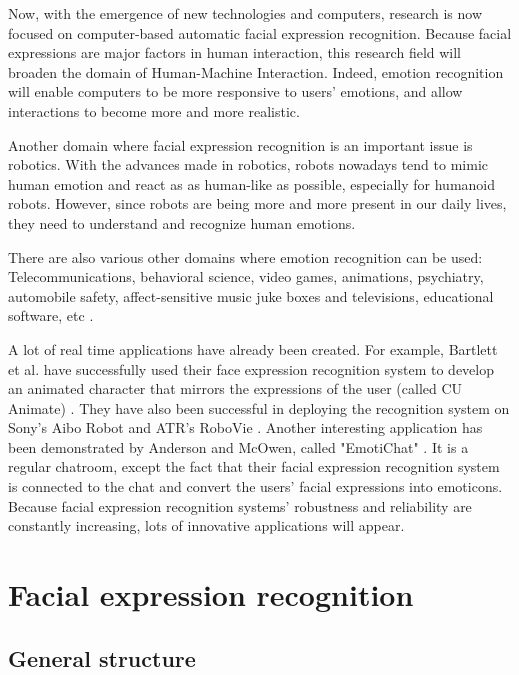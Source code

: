 \noindent Now, with the emergence of new technologies and computers, research is now focused on computer-based automatic facial expression recognition. Because facial expressions are major factors in human interaction, this research field will broaden the domain of Human-Machine Interaction. Indeed, emotion recognition will enable computers to be more responsive to users' emotions, and allow interactions to become more and more realistic. 
\newline

\noindent Another domain where facial expression recognition is an important issue is robotics. With the advances made in robotics, robots nowadays tend to mimic human emotion and react as as human-like as possible, especially for humanoid robots. However, since robots are being more and more present in our daily lives, they need to understand and recognize human emotions.
\newline

\noindent There are also various other domains where emotion recognition can be used: Telecommunications, behavioral science, video games, animations, psychiatry, automobile safety, affect-sensitive music juke boxes and televisions, educational software, etc \cite{BET12}.
\newline

\noindent A lot of real time applications have already been created. For example, Bartlett et al. have successfully used their face expression recognition system to develop an animated character that mirrors the expressions of the user (called CU Animate) \cite{BAR03}. They have also been successful in deploying the recognition system on Sony's Aibo Robot and ATR's RoboVie \cite{BAR03}. Another interesting application has been demonstrated by Anderson and McOwen, called "EmotiChat" \cite{AND06}. It is a regular chatroom, except the fact that their facial expression recognition system is connected to the chat and convert the users' facial expressions into emoticons. Because facial expression recognition systems' robustness and reliability are constantly increasing, lots of innovative applications will appear.
\newpage

\chapter{Facial expression recognition}

\section{General structure}

